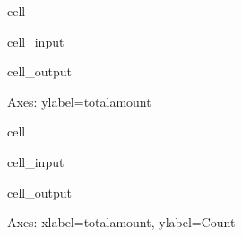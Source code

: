 \documentclass[letterpaper,10pt,english]{sphinxmanual}
\begin{document}
\begin{sphinxuseclass}{cell}
\begin{sphinxuseclass}{cell_input}
\begin{sphinxVerbatim}[commandchars=\\\{\}]
\PYG{p}{[}\PYG{p}{]} 
\end{sphinxVerbatim}

\end{sphinxuseclass}
\begin{sphinxuseclass}{cell_output}
\begin{sphinxVerbatim}[commandchars=\\\{\}]
\PYGZlt{}Axes: ylabel=\PYGZsq{}total\PYGZus{}amount\PYGZsq{}\PYGZgt{}
\end{sphinxVerbatim}

\noindent{}

\end{sphinxuseclass}
\end{sphinxuseclass}
\begin{sphinxuseclass}{cell}
\begin{sphinxuseclass}{cell_input}
\begin{sphinxVerbatim}[commandchars=\\\{\}]
\PYG{p}{[}\PYG{p}{]} 
\end{sphinxVerbatim}

\end{sphinxuseclass}
\begin{sphinxuseclass}{cell_output}
\begin{sphinxVerbatim}[commandchars=\\\{\}]
\PYGZlt{}Axes: xlabel=\PYGZsq{}total\PYGZus{}amount\PYGZsq{}, ylabel=\PYGZsq{}Count\PYGZsq{}\PYGZgt{}
\end{sphinxVerbatim}

\noindent{}

\end{sphinxuseclass}
\end{sphinxuseclass}
\sphinxAtStartPar
{}
\end{document}
